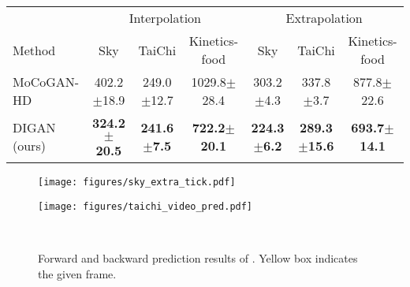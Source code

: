 \documentclass{article} \usepackage{iclr2022_conference,times}
\makeatletter
\DeclareRobustCommand\onedot{\futurelet\@let@token\@onedot}
\def\@onedot{\ifx\@let@token.\else.\null\fi\xspace}
\def\ie{\emph{i.e}\onedot} \def\Ie{\emph{I.e}\onedot}
\newcommand{\stdv}[1]{\scriptsize$\pm$#1}
\makeatother
\begin{document}
\begin{table*}[t]
\centering\small
\caption{
FVD values of generated videos inter- and extra-polated over time. All models are trained on 16 frame videos of  128$\times$128 resolution. The videos are interpolated to 64 frames (\ie, 4$\times$ finer) and extrapolated 16 more frames. We measure FVD with 512 samples for Sky, since the test data size becomes less than 2,048.}
\label{tab:inter_extra}
\vspace{-0.1in}
\begin{tabular}{lcccccc}
\toprule
& \multicolumn{3}{c}{Interpolation} & \multicolumn{3}{c}{Extrapolation} \\
\cmidrule(lr){2-4}\cmidrule(lr){5-7}
Method & Sky & TaiChi & Kinetics-food & Sky & TaiChi & Kinetics-food \\
\midrule
MoCoGAN-HD & 402.2\stdv{18.9} & 249.0\stdv{12.7} & 1029.8\stdv{28.4} & 303.2\stdv{4.3} & 337.8\stdv{3.7\phantom{0}} & 877.8\stdv{22.6} \\
DIGAN (ours) & \textbf{324.2\stdv{20.5}} & \textbf{241.6\stdv{7.5\phantom{0}}} & \textbf{\phantom{0}722.2\stdv{20.1}} & \textbf{224.3\stdv{6.2}} & \textbf{289.3\stdv{15.6}} &
\textbf{693.7\stdv{14.1}}
\\
\bottomrule
\end{tabular}
\begin{subfigure}{\textwidth}
\vspace{0.05in}
\texttt{[image: figures/sky\_extra\_tick.pdf]}
\end{subfigure}
\vspace{0.05in}
 \label{fig:inter_extra}
\end{table*} \begin{figure*}[t]
\centering\small
\vspace{-0.2in}
\begin{minipage}{0.52\textwidth}
\centering\small
\texttt{[image: figures/taichi\_video\_pred.pdf]}
\vspace{-0.2in}
\caption{
Forward and backward prediction results of \sname. Yellow box indicates the given frame.
}\label{fig:non_auto}
\end{minipage}
~
\begin{minipage}{0.46\textwidth}
\centering\small
{}
\end{minipage}
\end{figure*}
\end{document}
